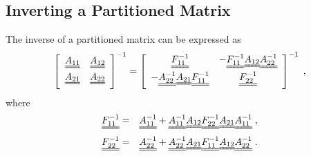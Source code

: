 \documentclass[11pt]{article} %
\begin{document}
\subsection{Inverting a Partitioned Matrix}
The inverse of a partitioned matrix can be expressed as
\begin{equation}
\left[\begin{array}{cc} \uuline{A_{11}} & \uuline{A_{12}}\\ \uuline{A_{21}} & \uuline{A_{22}} \end{array} \right]^{-1} = \left[\begin{array}{cc} \uuline{F_{11}^{-1}} & -\uuline{F_{11}^{-1}}\uuline{A_{12}}\uuline{A_{22}^{-1}}\\ -\uuline{A_{22}^{-1}}\uuline{A_{21}}\uuline{F_{11}^{-1}} & \uuline{F_{22}^{-1}} \end{array} \right]^{-1} \; ,
\end{equation}
where
\begin{eqnarray}
\uuline{F_{11}^{-1}} & = & \uuline{A_{11}^{-1}} + \uuline{A_{11}^{-1}} \uuline{A_{12}} \uuline{F_{22}^{-1}} \uuline{A_{21}} \uuline{A_{11}^{-1}} \; ,\\
\uuline{F_{22}^{-1}} & = & \uuline{A_{22}^{-1}} + \uuline{A_{22}^{-1}} \uuline{A_{21}} \uuline{F_{11}^{-1}} \uuline{A_{12}} \uuline{A_{22}^{-1}} \; .
\end{eqnarray}
\clearpage
\end{document}

